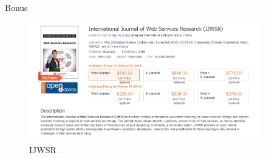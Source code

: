 \documentclass{beamer}		%
\begin{document}
\begin{frame}{Bonus}
\begin{figure}
    \centering
    \includegraphics[width=0.9\textwidth]{journal.png}
    \caption{IJWSR}
\end{figure}
\end{frame}
\end{document}
